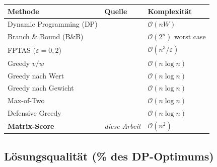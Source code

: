 \documentclass[a4paper,11pt]{article}
\begin{document}
\begin{center}
\small
\renewcommand{\arraystretch}{1.15}
\begin{tabular}{lll}
\toprule
Methode & Quelle & Komplexität \\
\midrule
Dynamic Programming (DP)
  & \citet{bellman1957} & $\mathcal{O}(nW)$ \\
Branch \& Bound (B\&B)
  & \citet{kolesar1967} & $\mathcal{O}(2^n)$ worst case \\
FPTAS ($\varepsilon=0{,}2$)
  & \citet{ibarra1975} & $\mathcal{O}(n^3/\varepsilon)$ \\
Greedy $v/w$
  & \citet{dantzig1957} & $\mathcal{O}(n\log n)$ \\
Greedy nach Wert
  & \citet{hristakeva2005} & $\mathcal{O}(n\log n)$ \\
Greedy nach Gewicht
  & \citet{hristakeva2005} & $\mathcal{O}(n\log n)$ \\
Max-of-Two
  & \citet{hristakeva2023} & $\mathcal{O}(n\log n)$ \\
Defensive Greedy
  & \citet{hristakeva2023} & $\mathcal{O}(n\log n)$ \\
\midrule
\textbf{Matrix-Score}
  & \textit{diese Arbeit} & $\mathcal{O}(n^2)$ \\
\bottomrule
\end{tabular}
\end{center}

\subsection{Lösungsqualität (\% des DP-Optimums)}
\end{document}
